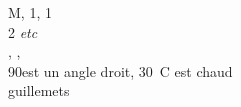 M, 1\ier, 1\iere\\

2\ieme{} \emph{etc}\\
, ,
\\
90\degres est un angle droit,
30~\degres C est chaud\\

\og guillemets\fg
